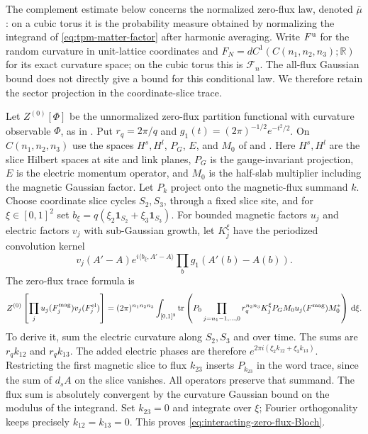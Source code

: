\documentclass[11pt,letterpaper,reqno]{amsart}
\newcommand{\R}{\mathbb R}
\newcommand{\dd}{\mathrm d}
\DeclareMathOperator{\tr}{tr}
\begin{document}
The complement estimate below concerns the normalized
zero-flux law, denoted $\bar\mu$: on a cubic torus it is the
probability measure obtained by normalizing the integrand of
\eqref{eq:tpm-matter-factor} after harmonic averaging.
Write $F^{\rm u}$ for the random curvature in unit-lattice
coordinates and $F_N=dC^1(C(n_1,n_2,n_3);\R)$ for its exact
curvature space; on the cubic torus this is $\mathcal F_n$.
The all-flux Gaussian bound does not directly
give a bound for this conditional law.
We therefore retain the sector projection in
the coordinate-slice trace.

Let $Z^{(0)}[\Phi]$ be the unnormalized zero-flux partition
functional with curvature observable $\Phi$, as in
\cite[(34)]{ReferenceResponse}. Put $r_q=2\pi/q$ and
$g_1(t)=(2\pi)^{-1/2}e^{-t^2/2}$.
On $C(n_1,n_2,n_3)$ use the spaces $H^s,H^l$,
$P_G$, $E$, and $M_0$ of
\cite[(80)]{ChamberLattice} and
\cite[(82)]{ChamberLattice}.
Here $H^s,H^l$ are the slice Hilbert spaces at site and link
planes, $P_G$ is the gauge-invariant projection, $E$ is the
electric momentum operator, and $M_0$ is the half-slab
multiplier including the magnetic Gaussian factor.
Let $P_k$ project onto the magnetic-flux
summand $k$. Choose coordinate slice cycles
$S_2,S_3$, through a fixed slice site, and
for $\xi\in[0,1]^2$ set
$b_\xi=q(\xi_2\mathbf1_{S_2}+\xi_3\mathbf1_{S_3})$.
For bounded magnetic factors $u_j$ and
electric factors $v_j$ with sub-Gaussian growth,
let $K_j^\xi$ have the periodized convolution kernel
\[
 v_j(A'-A)e^{i\langle b_\xi,A'-A\rangle}
                         \prod_bg_1(A'(b)-A(b)).
\]
The zero-flux trace formula is
\begin{equation}\label{eq:interacting-zero-flux-Bloch}
 Z^{(0)}\left[\prod_ju_j(F_j^{\rm mag})v_j(F_j^{\rm el})\right]
 =(2\pi)^{n_1n_2n_3}\int_{[0,1]^2}
 \tr\left(P_0\prod_{j=n_1-1,\ldots,0}
                  r_q^{n_2n_3}K_j^\xi P_GM_0u_j(F^{\rm mag})M_0^*\right)
                                                        \,\dd\xi .
\end{equation}
To derive it, sum the electric curvature along
$S_2,S_3$ and over time. The sums are
$r_qk_{12}$ and $r_qk_{13}$.
The added electric phases are therefore
$e^{2\pi i(\xi_2k_{12}+\xi_3k_{13})}$.
Restricting the first magnetic slice to
flux $k_{23}$ inserts $P_{k_{23}}$ in the
word trace, since the sum of $d_sA$ on
the slice vanishes. All operators preserve
that summand. The flux sum is absolutely
convergent by the curvature Gaussian bound
on the modulus of the integrand.
Set $k_{23}=0$ and integrate over $\xi$;
Fourier orthogonality keeps precisely
$k_{12}=k_{13}=0$. This proves
\eqref{eq:interacting-zero-flux-Bloch}.
\end{document}
